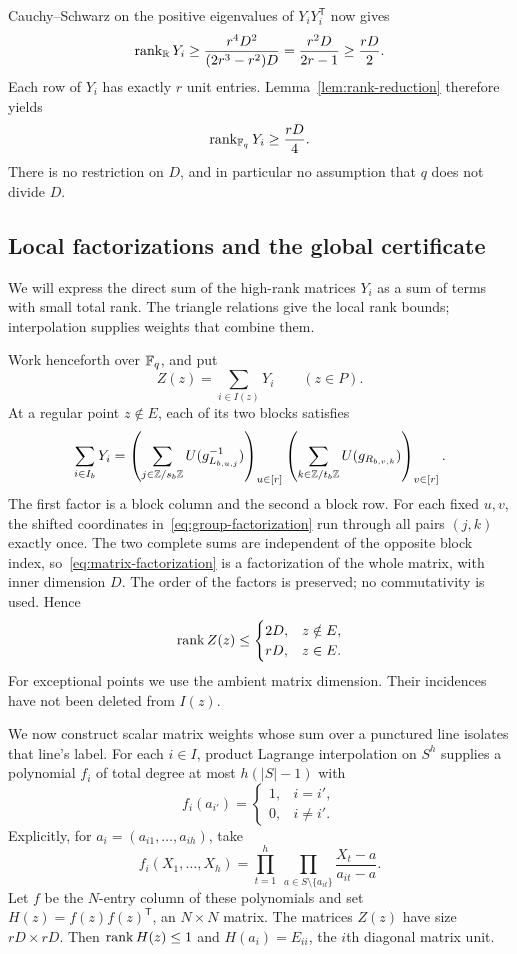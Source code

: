 Cauchy--Schwarz on the positive eigenvalues of $Y_iY_i^{\mathsf T}$ now gives
\[
 \operatorname{rank}_{\mathbb R}Y_i\ge
 \frac{r^4D^2}{(2r^3-r^2)D}
 =\frac{r^2D}{2r-1}\ge\frac{rD}{2}.
\]
Each row of $Y_i$ has exactly $r$ unit entries. Lemma~\ref{lem:rank-reduction} therefore yields
\begin{equation}\label{eq:rank-lower}
 \operatorname{rank}_{\mathbb F_q}Y_i\ge\frac{rD}{4}.
\end{equation}
There is no restriction on $D$, and in particular no assumption that $q$ does not divide $D$.

\subsection{Local factorizations and the global certificate}

We will express the direct sum of the high-rank matrices $Y_i$ as a sum
of terms with small total rank. The triangle relations give the local
rank bounds; interpolation supplies weights that combine them.

Work henceforth over $\mathbb F_q$, and put
\[
 Z(z)=\sum_{i\in I(z)}Y_i\qquad(z\in P).
\]
At a regular point $z\notin E$, each of its two blocks satisfies
\begin{equation}\label{eq:matrix-factorization}
 \sum_{i\in I_b}Y_i
 =\left(\sum_{j\in\mathbb Z/s_b\mathbb Z}U(g_{L_{b,u,j}}^{-1})\right)_{u\in[r]}
  \left(\sum_{k\in\mathbb Z/t_b\mathbb Z}U(g_{R_{b,v,k}})\right)_{v\in[r]}.
\end{equation}
The first factor is a block column and the second a block row. For each fixed $u,v$, the shifted coordinates in~\eqref{eq:group-factorization} run through all pairs $(j,k)$ exactly once. The two complete sums are independent of the opposite block index, so~\eqref{eq:matrix-factorization} is a factorization of the whole matrix, with inner dimension $D$. The order of the factors is preserved; no commutativity is used. Hence
\begin{equation}\label{eq:rank-upper}
 \operatorname{rank} Z(z)\le
 \begin{cases}
 2D,&z\notin E,\\
 rD,&z\in E.
 \end{cases}
\end{equation}
For exceptional points we use the ambient matrix dimension. Their incidences have not been deleted from $I(z)$.

We now construct scalar matrix weights whose sum over a punctured line
isolates that line's label. For each $i\in I$, product Lagrange interpolation on $S^h$ supplies a polynomial $f_i$ of total degree at most $h(|S|-1)$ with
\[
 f_i(a_{i'})=\begin{cases}1,&i=i',\\0,&i\ne i'.\end{cases}
\]
Explicitly, for $a_i=(a_{i1},\ldots,a_{ih})$, take
\[
 f_i(X_1,\ldots,X_h)=
 \prod_{t=1}^h\ \prod_{a\in S\setminus\{a_{it}\}}
 \frac{X_t-a}{a_{it}-a}.
\]
Let $f$ be the $N$-entry column of these polynomials and set $H(z)=f(z)f(z)^{\mathsf T}$, an $N\times N$ matrix. The matrices $Z(z)$ have size $rD\times rD$. Then $\operatorname{rank} H(z)\le1$ and $H(a_i)=E_{ii}$, the $i$th diagonal matrix unit.

